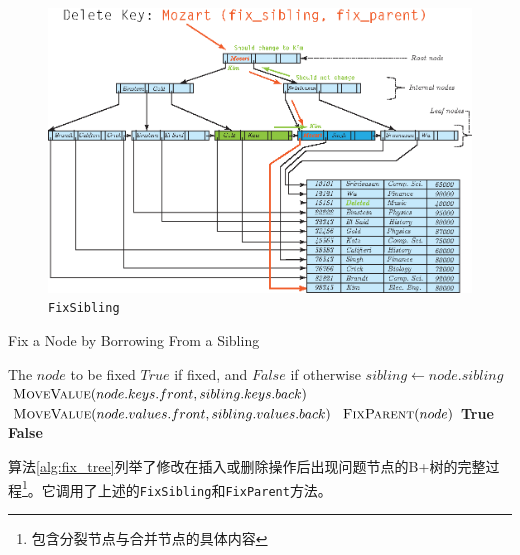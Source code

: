 \documentclass[UTF8]{ctexrep} %
\begin{document}
\begin{figure}[H]
    \centering
    \includegraphics[width=0.8\linewidth]{figure/fix_sibling.eps}
    \caption{\texttt{FixSibling}}
    \label{fig:fix_sibling}
\end{figure}


\begin{algorithm}[H]
    \caption{Fix a Node by Borrowing From a Sibling}
    \label{alg:fix_sibling}
    \begin{algorithmic}[1]
        \Require The $node$ to be fixed
        \Ensure $True$ if fixed, and $False$ if otherwise
            \State $sibling \leftarrow node.sibling$ 
             
                \State $\Call{MoveValue}{node.keys.front, sibling.keys.back}$ 
                \State $\Call{MoveValue}{node.values.front, sibling.values.back}$
                \State $\Call{FixParent}{node}$
                \State \Return \textbf{True}
            \Else
                \State \Return \textbf{False}
            \EndIf
        \EndFunction
    \end{algorithmic}
\end{algorithm}

算法\ref{alg:fix_tree}列举了修改在插入或删除操作后出现问题节点的B+树的完整过程\footnote{包含分裂节点与合并节点的具体内容}。它调用了上述的\texttt{FixSibling}和\texttt{FixParent}方法。
\end{document}
